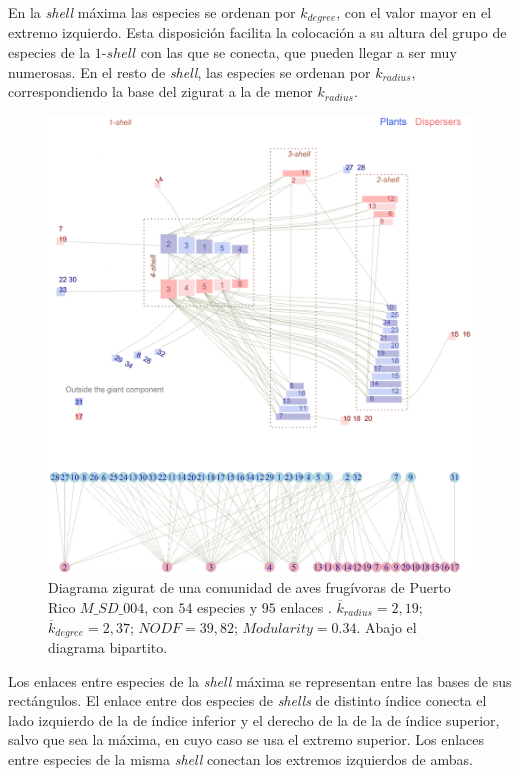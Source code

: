 En la \textit{shell} máxima las especies se ordenan por $k_{degree}$, con el valor mayor en el extremo izquierdo. Esta disposición facilita la colocación a su altura del grupo de especies de la $1$-$shell$ con las que se conecta, que pueden llegar a ser muy numerosas. En el resto de \textit{shell}, las especies se ordenan por $k_{radius}$, correspondiendo la base del zigurat a la de menor $k_{radius}$.

\begin{figure}[hb!]
\centering
\includegraphics[scale=0.45]{Figures/VIS_ALL_SD_004.eps}
\caption {Diagrama zigurat de una comunidad de aves frugívoras de Puerto Rico  $M\_SD\_004$, con $54$ especies y $95$ enlaces \cite{carlo2003avian}. $\overline k_{radius} = 2,19$; $\overline k_{degree} = 2,37$; $NODF = 39,82$; $Modularity = 0.34$. Abajo el diagrama bipartito.}
\label{fig:ziggurat}
\end{figure}

Los enlaces entre especies de la \textit{shell} máxima se representan entre las bases de sus rectángulos. El enlace entre dos especies de \textit{shells} de distinto índice conecta el lado izquierdo de la de índice inferior y el derecho de la de la de índice superior, salvo que sea la máxima, en cuyo caso se usa el extremo superior. Los enlaces entre especies de la misma \textit{shell} conectan los extremos izquierdos de ambas.

